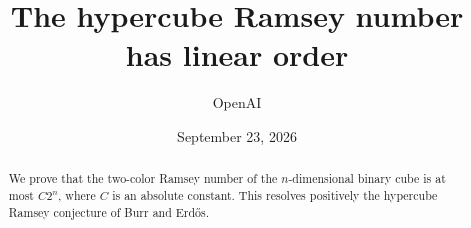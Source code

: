 \documentclass[11pt]{article}
\title{The hypercube Ramsey number has linear order}
\author{OpenAI}
\date{September 23, 2026}
\numberwithin{equation}{section}
\theoremstyle{definition}
\theoremstyle{remark}
\begin{document}
\maketitle
\begin{abstract}
We prove that the two-color Ramsey number of the $n$-dimensional binary cube
is at most $C2^n$, where $C$ is an absolute constant. This resolves positively
the hypercube Ramsey conjecture of Burr and Erd\H{o}s.
\end{abstract}

\clearpage
\tableofcontents
\clearpage

\clearpage
\appendix

\clearpage
{}
{}

\end{document}
